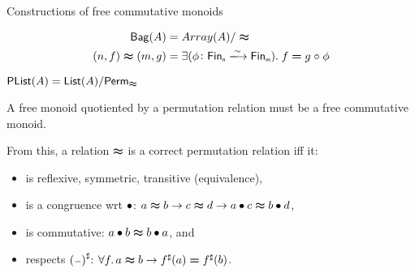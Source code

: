 \documentclass[9pt]{beamer}
\begin{document}
\begin{frame}[fragile]{Constructions of free commutative monoids}
    \begin{dblock}[Bags]
        \vspace{-0.4cm}
        \begin{align*}
            \type{Bag}(A) &= Array(A) / \reln
            \\
            (n,f) \reln (m,g) &= 
                \exis{\phi\colon \Fin[n]\xto{\sim}\Fin[m]}{f \id g \comp \phi}
        \end{align*}
    \end{dblock}
    \begin{dblock}
        $\mathsf{PList}(A) = \mathsf{List}(A) / \mathsf{Perm}_{\mathrel{\boldsymbol{\approx}}}$
    \end{dblock}
    A free monoid quotiented by a \alert{permutation relation} must be a free commutative monoid. 

    From this, a relation $\mathrel{\boldsymbol{\approx}}$ is a \alert{correct} permutation relation iff it:
    \begin{itemize}
        \item is reflexive, symmetric, transitive (equivalence),
        \item is a congruence wrt $\bullet$: $a \mathrel{\boldsymbol{\approx}} b \to c \mathrel{\boldsymbol{\approx}} d \to a \bullet c \mathrel{\boldsymbol{\approx}} b \bullet d$,
        \item is commutative: $a \bullet b \mathrel{\boldsymbol{\approx}} b \bullet a$, and
        \item respects ${({\scriptstyle{-}})}^{\sharp}$: $\forall f. \, a \reln b \to \ext{f}(a) \id \ext{f}(b)$.
    \end{itemize}
\end{frame}
\end{document}
